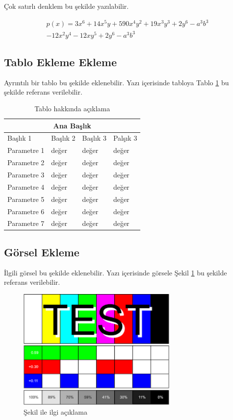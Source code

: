 \documentclass[12pt, a4paper]{article}
\begin{document}
\hspace{1cm} Çok satırlı denklem bu şekilde yazılabilir.

\begin{multline*}
p(x) = 3x^6 + 14x^5y + 590x^4y^2 + 19x^3y^3 +  2y^6 - a^3b^3\\ 
- 12x^2y^4 - 12xy^5 + 2y^6 - a^3b^3
\end{multline*}



\subsection{Tablo Ekleme Ekleme}
\hspace{1cm} Ayrıntılı bir tablo bu şekilde eklenebilir. Yazı içerisinde tabloya Tablo \ref{table:1} bu şekilde referans verilebilir.

\begin{table}[h!]
\centering
\begin{tabular}{ |p{3cm}||p{3cm}|p{3cm}|p{3cm}|  }
\hline
\multicolumn{4}{|c|}{Ana Başlık} \\
\hline
Başlık 1& Başlık 2 &Başlık 3&Palşık 3\\
\hline
Parametre 1  	& değer 	&değer	&değer\\
Parametre 2	& değer  	&değer	&değer\\
Parametre 3	& değer 	&değer	&değer\\
Parametre 4	& değer 	&değer	&değer\\
Parametre 5	& değer 	&değer	&değer\\
Parametre 6	& değer  	&değer	&değer\\
Parametre 7	& değer 	&değer	&değer\\
\hline
\end{tabular}
\caption{Tablo hakkında açıklama}
\label{table:1}
\end{table}

\subsection{Görsel Ekleme}
\hspace{1cm} İlgili görsel bu şekilde eklenebilir. Yazı içerisinde görsele Şekil \ref{fig:test} bu şekilde referans verilebilir. 

\begin{figure}[h!]
 	\centering
	\shorthandoff{=}
      \includegraphics[width=0.7\textwidth]{Test.png}
	\caption{\label{fig:test}Şekil ile ilgi açıklama}
\end{figure}
\end{document}
